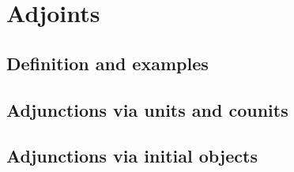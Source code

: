 \chapter{Adjoints}



\section{Definition and examples}
\addtocounter{subsection}{11}










\section{Adjunctions via units and counits}
\addtocounter{subsection}{9}









\section{Adjunctions via initial objects}
\addtocounter{subsection}{7}






